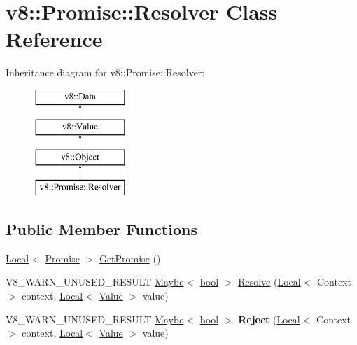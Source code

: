 \hypertarget{classv8_1_1Promise_1_1Resolver}{}\section{v8\+:\+:Promise\+:\+:Resolver Class Reference}
\label{classv8_1_1Promise_1_1Resolver}
Inheritance diagram for v8\+:\+:Promise\+:\+:Resolver\+:\begin{figure}[H]
\begin{center}
\leavevmode
\includegraphics[height=4.000000cm]{classv8_1_1Promise_1_1Resolver}
\end{center}
\end{figure}
\subsection*{Public Member Functions}
\begin{DoxyCompactItemize}
\item 
\mbox{\hyperlink{classv8_1_1Local}{Local}}$<$ \mbox{\hyperlink{classv8_1_1Promise}{Promise}} $>$ \mbox{\hyperlink{classv8_1_1Promise_1_1Resolver_a6f2f1c4d0d44d5c9cbf45404391fe83c}{Get\+Promise}} ()
\item 
V8\+\_\+\+W\+A\+R\+N\+\_\+\+U\+N\+U\+S\+E\+D\+\_\+\+R\+E\+S\+U\+LT \mbox{\hyperlink{classv8_1_1Maybe}{Maybe}}$<$ \mbox{\hyperlink{classbool}{bool}} $>$ \mbox{\hyperlink{classv8_1_1Promise_1_1Resolver_a469d20994b5f5ea55ee4cb6d4573f31a}{Resolve}} (\mbox{\hyperlink{classv8_1_1Local}{Local}}$<$ Context $>$ context, \mbox{\hyperlink{classv8_1_1Local}{Local}}$<$ \mbox{\hyperlink{classv8_1_1Value}{Value}} $>$ value)
\item 
\mbox{\label{classv8_1_1Promise_1_1Resolver_aca1707bb285e461981e3818d338e49c2}} 
V8\+\_\+\+W\+A\+R\+N\+\_\+\+U\+N\+U\+S\+E\+D\+\_\+\+R\+E\+S\+U\+LT \mbox{\hyperlink{classv8_1_1Maybe}{Maybe}}$<$ \mbox{\hyperlink{classbool}{bool}} $>$ {\bfseries Reject} (\mbox{\hyperlink{classv8_1_1Local}{Local}}$<$ Context $>$ context, \mbox{\hyperlink{classv8_1_1Local}{Local}}$<$ \mbox{\hyperlink{classv8_1_1Value}{Value}} $>$ value)
\end{DoxyCompactItemize}
